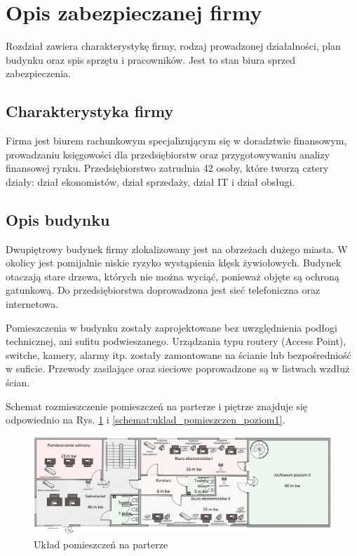 \newpage\section{Opis zabezpieczanej firmy}
Rozdział zawiera charakterystykę firmy, rodzaj prowadzonej działalności, plan budynku oraz spis sprzętu i pracowników. Jest to stan biura sprzed zabezpieczenia.

\subsection{Charakterystyka firmy}
Firma jest biurem rachunkowym specjalizującym się w doradztwie \linebreak finansowym, prowadzaniu księgowości dla przedsiębiorstw oraz przygotowywaniu analizy finansowej rynku. Przedsiębiorstwo zatrudnia 42 osoby, które tworzą cztery działy: dział ekonomistów, dział sprzedaży, dział IT i dział obsługi.

\subsection{Opis budynku}
Dwupiętrowy budynek firmy zlokalizowany jest na obrzeżach dużego miasta. W okolicy jest pomijalnie niskie ryzyko wystąpienia klęsk \linebreak żywiołowych. Budynek otaczają stare drzewa, których nie można wyciąć, ponieważ objęte są ochroną gatunkową. Do przedsiębiorstwa doprowadzona jest sieć telefoniczna oraz internetowa.

Pomieszczenia w budynku zostały zaprojektowane bez uwzględnienia podłogi technicznej, ani sufitu podwieszanego. Urządzania typu routery (Access Point), switche, kamery, alarmy itp. zostały zamontowane na ścianie lub bezpośredniość w suficie. Przewody zasilające oraz sieciowe poprowadzone są w listwach wzdłuż ścian.

Schemat rozmieszczenie pomieszczeń na parterze i piętrze znajduje się odpowiednio na Rys. \ref{schemat:uklad_pomieszczen_poziom0} i \ref{schemat:uklad_pomieszczen_poziom1}.

\begin{landscape}
	\begin{figure}[!h]
		\vspace{3cm}
		\includegraphics[width=24cm]{uklad_pomieszczen_poziom0.png}
		\caption{Układ pomieszczeń na parterze}
		\label{schemat:uklad_pomieszczen_poziom0}
	\end{figure}
\end{landscape}

